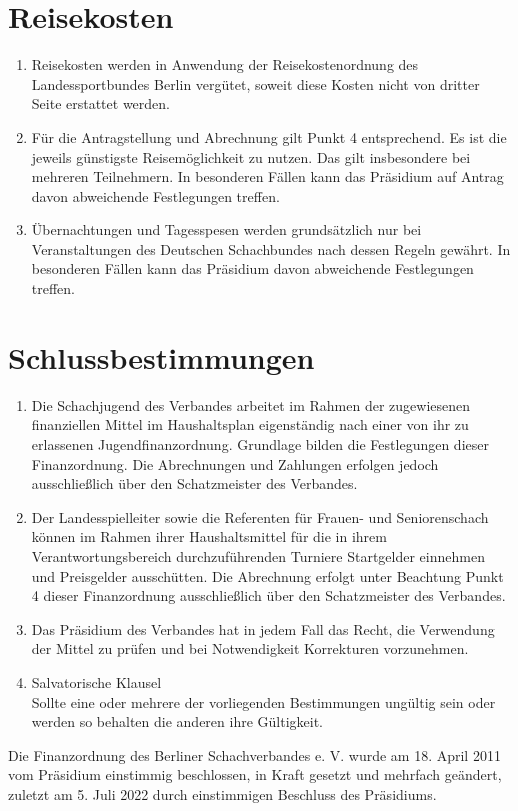 \documentclass[fontsize=12pt, paper=a4, ngerman]{article}
\begin{document}
\section{Reisekosten}
\begin{enumerate}
  \item Reisekosten werden in Anwendung der Reisekostenordnung des Landessportbundes
  Berlin vergütet, soweit diese Kosten nicht von dritter Seite erstattet werden.
  \item Für die Antragstellung und Abrechnung gilt Punkt 4 entsprechend. Es ist die jeweils
  günstigste Reisemöglichkeit zu nutzen. Das gilt insbesondere bei mehreren Teilnehmern.
  In besonderen Fällen kann das Präsidium auf Antrag davon abweichende Festlegungen treffen.
  \item Übernachtungen und Tagesspesen werden grundsätzlich nur bei Veranstaltungen des
  Deutschen Schachbundes nach dessen Regeln gewährt. In besonderen Fällen kann das
  Präsidium davon abweichende Festlegungen treffen.
\end{enumerate}

\section{Schlussbestimmungen}
\begin{enumerate}
  \item Die Schachjugend des Verbandes arbeitet im Rahmen der zugewiesenen finanziellen
  Mittel im Haushaltsplan eigenständig nach einer von ihr zu erlassenen
  Jugendfinanzordnung. Grundlage bilden die Festlegungen dieser Finanzordnung. Die
  Abrechnungen und Zahlungen erfolgen jedoch ausschließlich über den Schatzmeister des
  Verbandes.
  \item Der Landesspielleiter sowie die Referenten für Frauen- und Seniorenschach können im
  Rahmen ihrer Haushaltsmittel für die in ihrem Verantwortungsbereich durchzuführenden
  Turniere Startgelder einnehmen und Preisgelder ausschütten. Die Abrechnung erfolgt unter
  Beachtung Punkt 4 dieser Finanzordnung ausschließlich über den Schatzmeister des Verbandes.
  \item Das Präsidium des Verbandes hat in jedem Fall das Recht, die Verwendung der Mittel
  zu prüfen und bei Notwendigkeit Korrekturen vorzunehmen.
  \item Salvatorische Klausel \\
  Sollte eine oder mehrere der vorliegenden Bestimmungen ungültig sein oder werden so
  behalten die anderen ihre Gültigkeit.
\end{enumerate}

Die Finanzordnung des Berliner Schachverbandes e. V. wurde am 18. April 2011 vom Präsidium
einstimmig beschlossen, in Kraft gesetzt und mehrfach geändert, zuletzt am 5. Juli 2022 durch einstimmigen Beschluss des Präsidiums.
\end{document}
